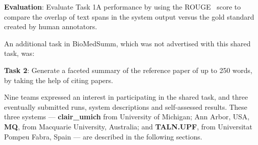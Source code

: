 \documentclass[11pt]{article}
\begin{document}
{\bf Evaluation}: Evaluate Task 1A performance by using the ROUGE~\cite{Lin:2004} score to 
compare the overlap of text spans in the system output versus the gold standard created by 
human annotators.

An additional task in BioMedSumm, which was not advertised with this shared task, was:

{\bf Task 2}: Generate a faceted summary of the reference paper of up to 250 words, 
by taking the help of citing papers.

Nine teams expressed an interest in participating in the shared task,
and three eventually submitted runs, system descriptions and
self-assessed results.  These three systems --- {\bf clair\_umich}
from University of Michigan; Ann Arbor, USA, {\bf MQ}, from Macquarie
University, Australia; and {\bf TALN.UPF}, from Universitat Pompeu
Fabra, Spain --- are described in the following sections.

\end{document}
